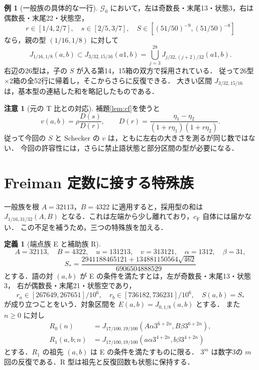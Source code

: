 \documentclass[10pt,a4paper]{article}
\theoremstyle{definition}
\newtheorem{definition}{定義}
\newtheorem{example}{例}
\newtheorem{remark}{注意}
\newcommand{\CF}{c_{\mathrm F}}
\newcommand{\G}{\mathcal G}
\begin{document}
\begin{example}[一般族の具体的な一行]\label{ex:row}
$\G_0$ において，左は奇数長・末尾13・状態3，右は偶数長・末尾22・状態空，
\[
 r\in[1/4,2/7],\quad s\in[2/5,3/7],\quad
 S\in[(51/50)^{-9},(51/50)^{-8}]
\]
なら，親の型 $(1/16,1/8)$ に対して
\[
 J_{1/16,1/8}(a,b)\subset J_{3/32,15/16}(a1,b)
 =\bigcup_{j=3}^{28}J_{j/32,(j+2)/32}(a1,b).
\]
右辺の26型は，子の $S$ が入る第14，15箱の双方で採用されている．
従って26型$\times$2箱の全52行に帰着し，そこからさらに反復できる．
大きい区間 $J_{3/32,15/16}$ は，基本型の連結した和を略記したものである．
\end{example}

\begin{remark}[元の T 比との対応]
補題\ref{lem:cf}を使うと
\[
 v(a,b)=\rho\frac{D(s)}{D(r)},\qquad
 D(r)=\frac{\eta_1-\eta_2}{(1+r\eta_1)(1+r\eta_2)}.
\]
従って今回の $S$ と Schecker の $v$ は，ともに左右の大きさを測るが同じ数ではない．
今回の許容性には，さらに禁止語状態と部分区間の型が必要になる．
\end{remark}

\section{Freiman 定数に接する特殊族}\label{sec:endpoint}
一般族を根 $A=32113$，$B=4322$ に適用すると，採用型の和は
$J_{1/16,31/32}(A,B)$ となる．これは左端から少し離れており，$\CF$ 自体には届かない．
この不足を補うため，三つの特殊族を加える．

\begin{definition}[端点族 E と補助族 R]\label{def:special}
\[
 A=32113,\quad B=4322,\quad u=131213,\quad v=313121,
 \quad\alpha=1312,\quad\beta=31,
\]
\[
 S_* =\frac{2941188465121+134881150564\sqrt{462}}{6906504888529}
\]
とする．語の対 $(a,b)$ が E の条件を満たすとは，左が奇数長・末尾13・状態3，
右が偶数長・末尾21・状態空であり，
\[
 r_a\in[267649,267651]/10^6,\quad
 r_b\in[736182,736231]/10^6,\quad S(a,b)=S_*
\]
が成り立つことをいう．対象区間を $E(a,b)=J_{0,1/8}(a,b)$ とする．
また $n\ge0$ に対し
\begin{align*}
 R_0(n)&=J_{17/100,19/100}(A\alpha3^{6+2n},B\beta3^{6+2n}),\\
 R_1(a,b;n)&=J_{17/100,19/100}(a\alpha3^{4+2n},b\beta3^{4+2n})
\end{align*}
とする．$R_1$ の祖先 $(a,b)$ は E の条件を満たすものに限る．
$3^m$ は数字3の $m$ 回の反復である．R 型は祖先と反復回数も状態に保持する．
\end{definition}
\end{document}
